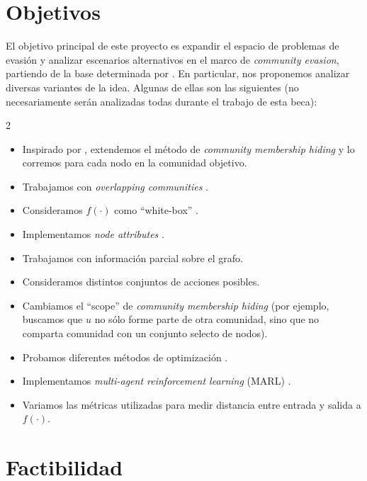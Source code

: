 \documentclass[11pt,a4paper]{article}
\begin{document}
\section*{Objetivos}

El objetivo principal de este proyecto es expandir el espacio de problemas de evasión y analizar escenarios alternativos en el marco de \textit{community evasion}, partiendo de
la base determinada por \textcite{bernini-2024}.
En particular, nos proponemos analizar diversas variantes de la idea. Algunas de ellas son las siguientes (no necesariamente serán analizadas todas durante el trabajo de esta beca):

\begin{multicols}{2}
\begin{itemize}[leftmargin=*, label=\textbullet, itemsep=0em, topsep=0pt]
    \item Inspirado por \cite{8118127}, extendemos el método de \textit{community membership hiding} y lo corremos para cada nodo en la comunidad objetivo.
    \item Trabajamos con \textit{overlapping communities} \cite{Xie_2013}.
    \item Consideramos $f(\cdot)$ como ``white-box'' \cite{jin2021surveycommunitydetectionapproaches}.
    \item Implementamos \textit{node attributes} \cite{Yang_2013}.
    \item Trabajamos con información parcial sobre el grafo.
    \item Consideramos distintos conjuntos de acciones posibles.
    \item Cambiamos el ``scope'' de \textit{community membership hiding} (por ejemplo, buscamos que $u$ no sólo forme parte de otra comunidad, sino que no comparta comunidad con un conjunto selecto de nodos).
    \item Probamos diferentes métodos de optimización \cite{lucic2022, trappolini2022sparseviciousattacksgraph}.
    \item Implementamos \textit{multi-agent reinforcement learning} (MARL) \cite{4445757}.
    \item Variamos las métricas utilizadas para medir distancia entre entrada y salida a $f(\cdot)$.
\end{itemize}
\end{multicols}

\section*{Factibilidad}
\end{document}

